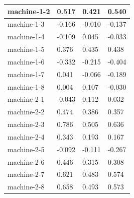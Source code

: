 \begin{table}[]
{\begin{tabular}{|l|l|l|l|}
machine-1-2     & 0.517                                  & 0.421                                 & 0.540                         \\ \hline
machine-1-3     & -0.166                                 & -0.010                                & -0.137                        \\ \hline
machine-1-4     & -0.109                                 & 0.045                                 & -0.033                        \\ \hline
machine-1-5     & 0.376                                  & 0.435                                 & 0.438                         \\ \hline
machine-1-6     & -0.332                                 & -0.215                                & -0.404                        \\ \hline
machine-1-7     & 0.041                                  & -0.066                                & -0.189                        \\ \hline
machine-1-8     & 0.004                                  & 0.107                                 & -0.030                        \\ \hline
machine-2-1     & -0.043                                 & 0.112                                 & 0.032                         \\ \hline
machine-2-2     & 0.474                                  & 0.386                                 & 0.357                         \\ \hline
machine-2-3     & 0.786                                  & 0.505                                 & 0.636                         \\ \hline
machine-2-4     & 0.343                                  & 0.193                                 & 0.167                         \\ \hline
machine-2-5     & -0.092                                 & -0.111                                & -0.267                        \\ \hline
machine-2-6     & 0.446                                  & 0.315                                 & 0.308                         \\ \hline
machine-2-7     & 0.621                                  & 0.483                                 & 0.574                         \\ \hline
machine-2-8     & 0.658                                  & 0.493                                 & 0.573                         \\ \hline

\end{tabular}}
\end{table}
